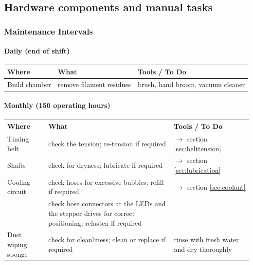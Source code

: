 \subsection{Hardware components and manual tasks}


\subsubsection{Maintenance Intervals}

\paragraph{Daily (end of shift)}

\begin{table}[H]
  \centering
  \begin{tabulary}{\textwidth}{ L L L }
    \toprule
    Where          &	    What                      &	 	Tools / To Do \\
    \midrule
    Build chamber  &	 	remove filament residues  &	 	brush, hand broom, vacuum cleaner \\
    \bottomrule
  \end{tabulary}
\end{table}    

\paragraph{Monthly (150 operating hours)}  

\begin{table}[H]
  \centering
  \begin{tabulary}{\textwidth}{ L L L }
    \toprule
    Where               &	  What                                                     &	 Tools / To Do \\
    \midrule
    Timing belt         &	  check the tension; re-tension if required                &	 $\rightarrow$ section \ref{sec:belttension} \\
    Shafts              &	  check for dryness; lubricate if required                 &	 $\rightarrow$ section \ref{sec:lubrication} \\
    Cooling circuit     &	  check hoses for excessive bubbles; refill if required    &   $\rightarrow$ section \ref{sec:coolant} \\
                        &	  check hose connectors at the LEDs and 
                              the stepper drives for correct positioning; 
                              refasten if required 	                                   &                  \\
    Dust wiping sponge  &	  check for cleanliness; 
                              clean or replace if required                             &  rinse with fresh water
                                                                                          and dry thoroughly \\
    \bottomrule
  \end{tabulary}
\end{table}


